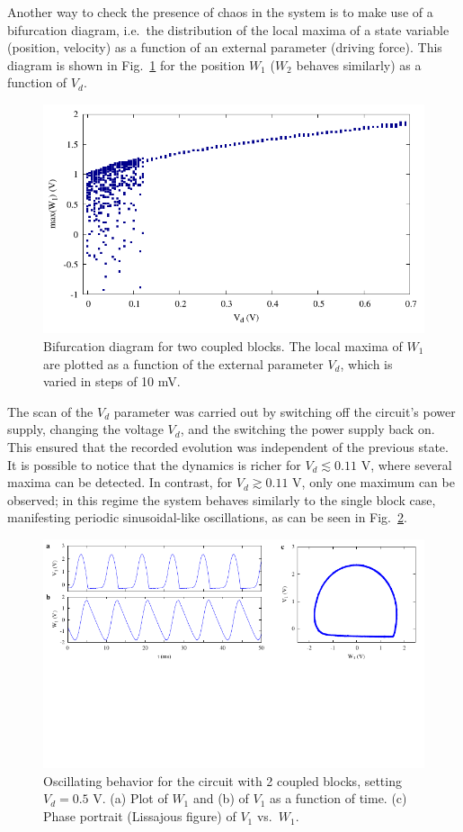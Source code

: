 Another way to check the presence of chaos in the system is to make use of a bifurcation diagram, i.e.\ the distribution
of the local maxima of a state variable (position, velocity) as a function of an external parameter (driving force).
This diagram is shown in Fig.~\ref{fig: bifurcation} for the position $W_1$ ($W_2$ behaves similarly) as a function of $V_d$.

\begin{figure}[!htbp]
    \centering
    \includegraphics[width=0.6\linewidth]{../blocks/2_blocks/bifurcation/bifurcation.pdf}
    \caption{Bifurcation diagram for two coupled blocks.
    The local maxima of $W_1$ are plotted as a function of the external parameter $V_d$,
    which is varied in steps of 10 mV.}\label{fig: bifurcation}
\end{figure}
The scan of the $V_d$ parameter was carried out by switching off the circuit's power supply, changing the voltage $V_d$,
and the switching the power supply back on. This ensured that the recorded evolution was independent of the previous state.
It is possible to notice that the dynamics is richer for $V_d\lesssim0.11$ V, where several maxima can be detected.
In contrast, for $V_d\gtrsim0.11$ V, only one maximum can be observed; in this regime the system behaves similarly
to the single block case, manifesting periodic sinusoidal-like oscillations, as can be seen in
Fig.~\ref{fig:2 blocks no chaos}.

\begin{figure}[ht!]
\centering
\includegraphics[width=\linewidth,trim={0 3.5cm 0 0},clip,center]{../blocks/2_blocks/two_blocks_nochaos.pdf}
\caption{Oscillating behavior for the circuit with 2 coupled blocks, setting $V_d=0.5$ V.
(a) Plot of $W_1$ and (b) of $V_1$ as a function of time.
(c) Phase portrait (Lissajous figure) of $V_1$ vs.\ $W_1$.
}\label{fig:2 blocks no chaos}
\end{figure}


